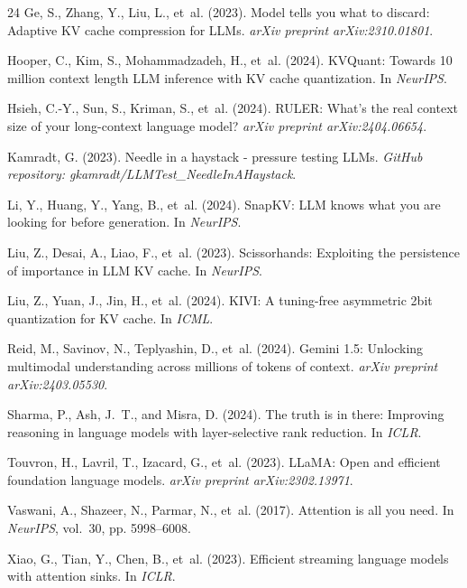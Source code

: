 \documentclass[10pt]{article}
\theoremstyle{definition}
\begin{document}
\begin{thebibliography}{24}
 Ge, S., Zhang, Y., Liu, L., et~al. (2023). Model tells you what to discard: Adaptive KV cache compression for LLMs. \textit{arXiv preprint arXiv:2310.01801}.

 Hooper, C., Kim, S., Mohammadzadeh, H., et~al. (2024). KVQuant: Towards 10 million context length LLM inference with KV cache quantization. In \textit{NeurIPS}.

 Hsieh, C.-Y., Sun, S., Kriman, S., et~al. (2024). RULER: What's the real context size of your long-context language model? \textit{arXiv preprint arXiv:2404.06654}.

 Kamradt, G. (2023). Needle in a haystack - pressure testing LLMs. \textit{GitHub repository: gkamradt/LLMTest\_NeedleInAHaystack}.

 Li, Y., Huang, Y., Yang, B., et~al. (2024). SnapKV: LLM knows what you are looking for before generation. In \textit{NeurIPS}.

 Liu, Z., Desai, A., Liao, F., et~al. (2023). Scissorhands: Exploiting the persistence of importance in LLM KV cache. In \textit{NeurIPS}.

 Liu, Z., Yuan, J., Jin, H., et~al. (2024). KIVI: A tuning-free asymmetric 2bit quantization for KV cache. In \textit{ICML}.

 Reid, M., Savinov, N., Teplyashin, D., et~al. (2024). Gemini 1.5: Unlocking multimodal understanding across millions of tokens of context. \textit{arXiv preprint arXiv:2403.05530}.

 Sharma, P., Ash, J.~T., and Misra, D. (2024). The truth is in there: Improving reasoning in language models with layer-selective rank reduction. In \textit{ICLR}.

 Touvron, H., Lavril, T., Izacard, G., et~al. (2023). LLaMA: Open and efficient foundation language models. \textit{arXiv preprint arXiv:2302.13971}.

 Vaswani, A., Shazeer, N., Parmar, N., et~al. (2017). Attention is all you need. In \textit{NeurIPS}, vol.~30, pp. 5998--6008.

 Xiao, G., Tian, Y., Chen, B., et~al. (2023). Efficient streaming language models with attention sinks. In \textit{ICLR}.


\end{thebibliography}
\end{document}
